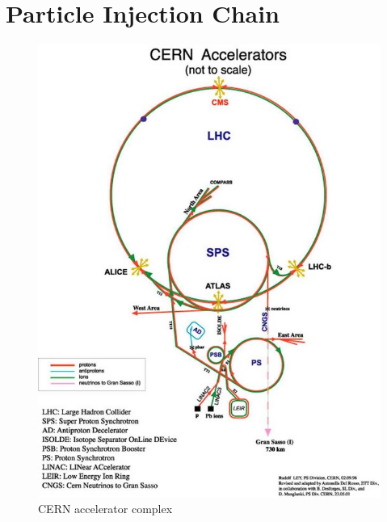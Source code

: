 \section{Particle Injection Chain} \label{sec:lhc:injection}

\begin{figure}[!htbp] 
  \begin{center}
    \includegraphics[width=0.9\linewidth]{figures/lhc/injection.jpg}
    \caption{ CERN accelerator complex} 
    \label{fig:injection_chain} 
  \end{center} 
\end{figure}

